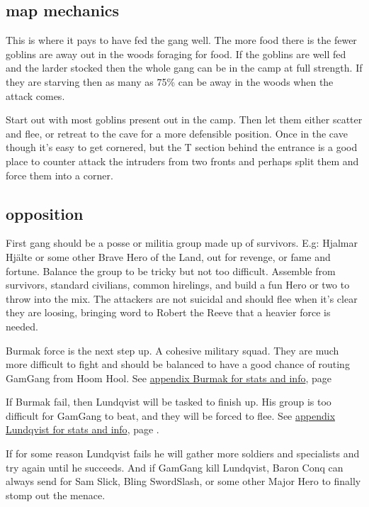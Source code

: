 \subsection*{map mechanics}

This is where it pays to have fed the gang well. The more food there is the fewer goblins are away out in the woods foraging for food. If the goblins are well fed and the larder stocked then the whole gang can be in the camp at full strength. If they are starving then as many as 75\% can be away in the woods when the attack comes.

Start out with most goblins present out in the camp. Then let them either scatter and flee, or retreat to the cave for a more defensible position. Once in the cave though it's easy to get cornered, but the T section behind the entrance is a good place to counter attack the intruders from two fronts and perhaps split them and force them into a corner.


\subsection*{opposition}

First gang should be a posse or militia group made up of survivors. E.g: Hjalmar Hjälte or some other Brave Hero of the Land, out for revenge, or fame and fortune. Balance the group to be tricky but not too difficult. Assemble from survivors, standard civilians, common hirelings, and build a fun Hero or two to throw into the mix.
The attackers are not suicidal and should flee when it's clear they are loosing, bringing word to Robert the Reeve that a heavier force is needed.

Burmak force is the next step up. A cohesive military squad. They are much more difficult to fight and should be balanced to have a good chance of routing GamGang from Hoom Hool. See \hyperref[appendixburmak]{appendix Burmak for stats and info}, page \pageref{appendixburmak}

If Burmak fail, then Lundqvist will be tasked to finish up. His group is too difficult for GamGang to beat, and they will be forced to flee. See \hyperref[appendixlundqvist]{appendix Lundqvist for stats and info}, page \pageref{appendixlundqvist}.

If for some reason Lundqvist fails he will gather more soldiers and specialists and try again until he succeeds. And if GamGang kill Lundqvist, Baron Conq can always send for Sam Slick, Bling SwordSlash, or some other Major Hero to finally stomp out the menace.


